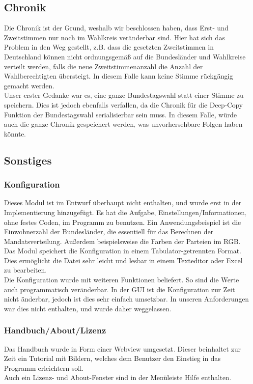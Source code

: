 \documentclass[12pt,a4paper,titlepage]{article}
\begin{document}
	\subsection{Chronik}
Die Chronik ist der Grund, weshalb wir beschlossen haben, dass Erst- und Zweitstimmen nur noch im Wahlkreis veränderbar sind. Hier hat sich das Problem in den Weg gestellt, z.B. dass die gesetzten Zweitstimmen in Deutschland können nicht ordnungsgemäß auf die Bundesländer und Wahlkreise verteilt werden, falls die neue Zweitstimmenanzahl die Anzahl der Wahlberechtigten übersteigt. In diesem Falle kann keine Stimme rückgängig gemacht werden. \\
Unser erster Gedanke war es, eine ganze Bundestagswahl statt einer Stimme zu speichern. Dies ist jedoch ebenfalls verfallen, da die Chronik für die Deep-Copy Funktion der Bundestagswahl serialisierbar sein muss. In diesem Falle, würde auch die ganze Chronik gespeichert werden, was unvorhersehbare Folgen haben könnte. 



	\subsection{Sonstiges}
\subsubsection{Konfiguration}
Dieses Modul ist im Entwurf überhaupt nicht enthalten, und wurde erst in der Implementierung hinzugefügt. Es hat die Aufgabe, Einstellungen/Informationen, ohne festes Coden, im Programm zu benutzen. Ein Anwendungsbeispiel ist die Einwohnerzahl der Bundesländer, die essentiell für das Berechnen der Mandatsverteilung. Außerdem beispielsweise die Farben der Parteien im RGB. \\
Das Modul speichert die Konfiguration in einem Tabulator-getrennten Format. Dies ermöglicht die Datei sehr leicht und lesbar in einem Texteditor oder Excel zu bearbeiten. \\
Die Konfiguration wurde mit weiteren Funktionen beliefert. So sind die Werte auch programmatisch veränderbar. In der GUI ist die Konfiguration zur Zeit nicht änderbar, jedoch ist dies sehr einfach umsetzbar. In unseren Anforderungen war dies nicht enthalten, und wurde daher weggelassen.

\subsubsection{Handbuch/About/Lizenz}
Das Handbuch wurde in Form einer Webview umgesetzt. Dieser beinhaltet zur Zeit ein Tutorial mit Bildern, welches dem Benutzer den Einstieg in das Programm erleichtern soll. \\
Auch ein Lizenz- und About-Fenster sind in der Menüleiste Hilfe enthalten.\\
\end{document}
